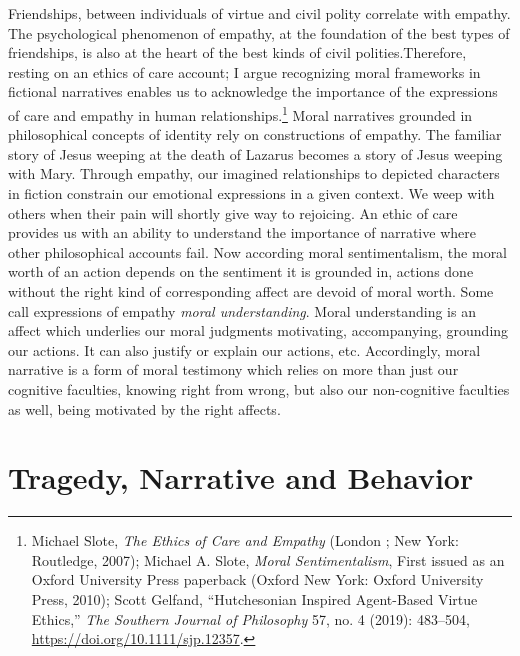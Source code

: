 \documentclass[phdthesis,12pt,final,a4paper]{wuthesis}
\theoremstyle{definition}
\theoremstyle{definition}
\theoremstyle{definition}
\theoremstyle{definition}
\theoremstyle{remark}
\begin{document}
Friendships, between individuals of virtue and civil polity correlate with empathy. The psychological phenomenon of empathy, at the foundation of the best types of friendships, is also at the heart of the best kinds of civil polities.Therefore, resting on an ethics of care account; I argue recognizing moral frameworks in fictional narratives enables us to acknowledge the importance of the expressions of care and empathy in human relationships.\footnote{Michael Slote, \emph{The {Ethics} of {Care} and {Empathy}} (London ; New York: Routledge, 2007); Michael A. Slote, \emph{Moral {Sentimentalism}}, First issued as an Oxford University Press paperback (Oxford New York: Oxford University Press, 2010); Scott Gelfand, {``Hutchesonian Inspired Agent-Based Virtue Ethics,''} \emph{The Southern Journal of Philosophy} 57, no. 4 (2019): 483--504, \url{https://doi.org/10.1111/sjp.12357}.} Moral narratives grounded in philosophical concepts of identity rely on constructions of empathy. The familiar story of Jesus weeping at the death of Lazarus becomes a story of Jesus weeping with Mary. Through empathy, our imagined relationships to depicted characters in fiction constrain our emotional expressions in a given context. We weep with others when their pain will shortly give way to rejoicing. An ethic of care provides us with an ability to understand the importance of narrative where other philosophical accounts fail. Now according moral sentimentalism, the moral worth of an action depends on the sentiment it is grounded in, actions done without the right kind of corresponding affect are devoid of moral worth. Some call expressions of empathy \emph{moral understanding}. Moral understanding is an affect which underlies our moral judgments motivating, accompanying, grounding our actions. It can also justify or explain our actions, etc. Accordingly, moral narrative is a form of moral testimony which relies on more than just our cognitive faculties, knowing right from wrong, but also our non-cognitive faculties as well, being motivated by the right affects.

\section{Tragedy, Narrative and Behavior}\label{tragedy-narrative-and-behavior}
\end{document}
